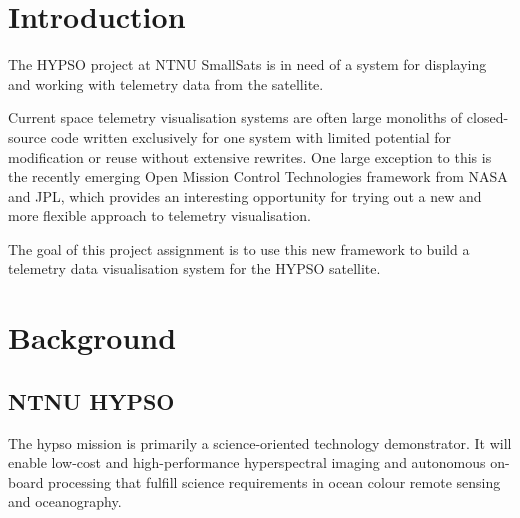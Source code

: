 \begin{comment}
Background
 - Smallsats
 - Mission planning and execution
 - Current telemetry display solutions
   - Large custom-made software suites, single-purpose - large time requirements for implementation and change

Motivation
 - NTNU SmallSat/HYPSO
 - Spacecraft telemetry
 - How should one display and process telemetry?
 - Why Open MCT works for this
   - Open framework, used by NASA on multiple projects; one of the few frameworks of its type that’s available to the public
   -Wanted to implement a well-documented and expandable solution for this; Open MCT has few existing implementations, as it is a fairly new framework - largely minor modifications of the tutorial
\end{comment}

\section{Introduction}

The HYPSO project at NTNU SmallSats is in need of a system for displaying and working with telemetry data from the satellite.

Current space telemetry visualisation systems are often large monoliths of closed-source code written exclusively for one system with limited potential for modification or reuse without extensive rewrites. One large exception to this is the recently emerging Open Mission Control Technologies framework from NASA and JPL, which provides an interesting opportunity for trying out a new and more flexible approach to telemetry visualisation.

The goal of this project assignment is to use this new framework to build a telemetry data visualisation system for the HYPSO satellite.

\section{Background}

\subsection{NTNU HYPSO}
The \acrshort{hypso} mission is primarily a science-oriented technology demonstrator. It will enable low-cost and high-performance hyperspectral imaging and autonomous on-board processing that fulfill science requirements in ocean colour remote sensing and oceanography.

